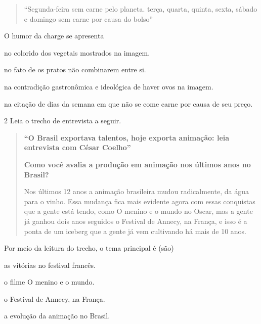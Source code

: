 \begin{quote}
``Segunda-feira sem carne pelo planeta. terça, quarta, quinta, sexta,
sábado e domingo sem carne por causa do bolso''
\end{quote}

O humor da charge se apresenta

\begin{escolha}
\item no colorido dos vegetais mostrados na imagem.

\item no fato de os pratos não combinarem entre si.

\item na contradição gastronômica e ideológica de haver ovos na imagem.

\item na citação de dias da semana em que não se come carne por causa de
seu preço.
\end{escolha}


\num{2} Leia o trecho de entrevista a seguir.

\begin{quote}
\textbf{``O Brasil exportava talentos, hoje exporta animação: leia
entrevista com César Coelho''}

\textbf{Como você avalia a produção em animação nos últimos anos no
Brasil?}

Nos últimos 12 anos a animação brasileira mudou radicalmente, da água
para o vinho. Essa mudança fica mais evidente agora com essas conquistas
que a gente está tendo, como O menino e o mundo no Oscar, mas a gente já
ganhou dois anos seguidos o Festival de Annecy, na França, e isso é a
ponta de um iceberg que a gente já vem cultivando há mais de 10 anos.

\end{quote}

Por meio da leitura do trecho, o tema principal é (são)

\begin{escolha}
\item as vitórias no festival francês.

\item o filme O menino e o mundo.

\item o Festival de Annecy, na França.

\item a evolução da animação no Brasil.
\end{escolha}

